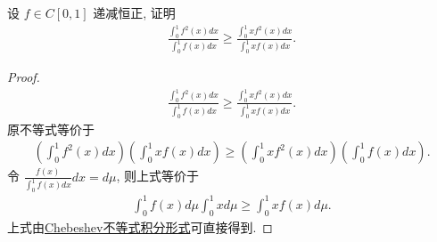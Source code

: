 \documentclass[../../main.tex]{subfiles}
\begin{document}
\begin{example}
设 $f \in C[0,1]$ 递减恒正, 证明
\begin{align*}
\frac{\int_0^1 f^2(x)dx}{\int_0^1 f(x)dx} \geqslant \frac{\int_0^1 xf^2(x)dx}{\int_0^1 xf(x)dx}.
\end{align*}
\end{example}
\begin{proof}
\begin{align*}
\frac{\int_0^1 f^2(x)dx}{\int_0^1 f(x)dx} \geqslant \frac{\int_0^1 xf^2(x)dx}{\int_0^1 xf(x)dx}.
\end{align*}
原不等式等价于
\begin{align*}
\left(\int_0^1 f^2(x)dx\right)\left(\int_0^1 xf(x)dx\right) \geqslant \left(\int_0^1 xf^2(x)dx\right)\left(\int_0^1 f(x)dx\right).
\end{align*}
令 $\frac{f(x)}{\int_0^1 f(x)dx}dx = d\mu$, 则上式等价于
\begin{align*}
\int_0^1 f(x)d\mu \int_0^1 xd\mu \geqslant \int_0^1 xf(x)d\mu.
\end{align*}
上式由\hyperref[Chebeshev不等式积分形式]{Chebeshev不等式积分形式}可直接得到. 
\end{proof}
\end{document}
